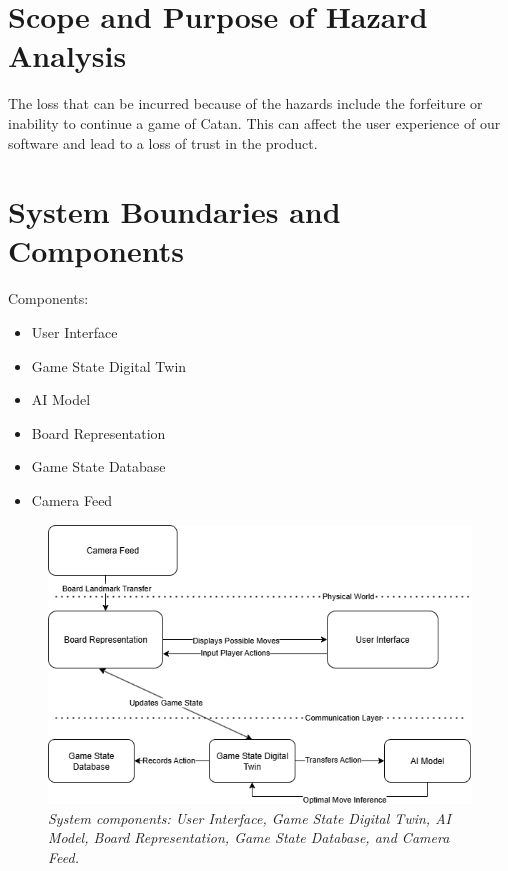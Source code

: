 \documentclass{article}
\begin{document}
\section{Scope and Purpose of Hazard Analysis}\label{sec:scope-and-purpose-of-hazard-analysis}



The loss that can be incurred because of the hazards include the
forfeiture or inability to continue a game of Catan. This can affect the
user experience of our software and lead to a loss of trust in the product.


\section{System Boundaries and Components}\label{sec:system-boundaries-and-components}




Components: 
\begin{itemize}

\item User Interface
\item Game State Digital Twin
\item AI Model
\item Board Representation
\item Game State Database
\item Camera Feed

\end{itemize}

\begin{figure}[H]
    \centering
    \includegraphics[width=\textwidth]{Component_Diagram_hazards.png}
    \caption{\textit{System components: User Interface, Game State Digital Twin, AI Model, Board Representation, Game State Database, and Camera Feed.}}
    \label{fig:component-diagram}
\end{figure}
\end{document}
